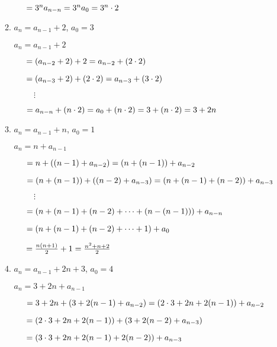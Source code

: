 \documentclass[11pt]{article}
\begin{document}
\begin{enumerate}[label=\textbf{\arabic*.}]
\begin{enumerate}[label=\textbf{\alph*)}]
		$\hspace{0.5cm} = 3^na_{n - n} = 3^na_0 = 3^n \cdot 2$
		
		\item $a_n = a_{n - 1} + 2$, $a_0 = 3$
		
		$a_n = a_{n - 1} + 2$
		
		$\hspace{0.5cm} = (a_{n - 2} + 2) + 2 = a_{n - 2} + (2 \cdot 2)$
		
		$\hspace{0.5cm} =  (a_{n - 3} + 2) + (2 \cdot 2) = a_{n - 3} + (3 \cdot 2)$

		$\hspace{1cm} \vdots$
		
		$\hspace{0.5cm} = a_{n - n} + (n \cdot 2) = a_0 + (n \cdot 2) = 3 + (n \cdot 2) = 3 + 2n$
		
		\item $a_n = a_{n - 1} + n$, $a_0 = 1$
		
		$a_n = n + a_{n - 1}$
		
		$\hspace{0.5cm} = n + ((n - 1) + a_{n - 2}) = (n + (n - 1)) + a_{n - 2}$
		
		$\hspace{0.5cm} = (n + (n - 1)) + ((n - 2) + a_{n - 3}) = (n + (n - 1) + (n - 2)) + a_{n - 3}$
		
		$\hspace{1cm} \vdots$
		
		$\hspace{0.5cm} = (n + (n - 1) + (n - 2) + \cdots + (n - (n - 1))) + a_{n - n}$
		
		$\hspace{0.5cm} = (n + (n - 1) + (n - 2) + \cdots + 1) + a_0$
		
		$\hspace{0.5cm} = \frac{n(n + 1)}{2} + 1 = \frac{n^2 + n + 2}{2}$
		
		\item $a_n = a_{n - 1} + 2n + 3$, $a_0 = 4$
		
		$a_n = 3 + 2n + a_{n - 1}$
		
		$\hspace{0.5cm} = 3 + 2n + (3 + 2(n - 1) + a_{n - 2}) = (2 \cdot 3 + 2n + 2(n - 1)) + a_{n - 2}$
		
		$\hspace{0.5cm} = (2 \cdot 3 + 2n + 2(n - 1)) + (3 + 2(n - 2) + a_{n - 3})$
		
		$\hspace{0.5cm} = (3 \cdot 3 + 2n + 2(n - 1) + 2(n - 2)) + a_{n - 3}$
		

\end{enumerate}
\end{enumerate}
\end{document}
